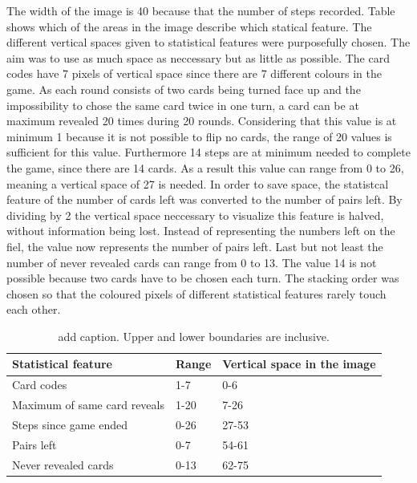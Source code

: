 The width of the image is 40 because that the number of steps recorded. Table  shows which of the areas in the image describe which statical feature. The different vertical spaces given to statistical features were purposefully chosen. The aim was to use as much space as neccessary but as little as possible. The card codes have 7 pixels of vertical space since there are 7 different colours in the game. As each round consists of two cards being turned face up and the impossibility to chose the same card twice in one turn, a card can be at maximum revealed 20 times during 20 rounds. Considering that this value is at minimum 1 because it is not possible to flip no cards, the range of 20 values is sufficient for this value. Furthermore 14 steps are at minimum needed to complete the game, since there are 14 cards. As a result this value can range from 0 to 26, meaning a vertical space of 27 is needed. In order to save space, the statistcal feature of the number of cards left was converted to the number of pairs left. By dividing by 2 the vertical space neccessary to visualize this feature is halved, without information being lost. Instead of representing the numbers left on the fiel, the value now represents the number of pairs left. Last but not least the number of never revealed cards can range from 0 to 13. The value 14 is not possible because two cards have to be chosen each turn. The stacking order was chosen so that the coloured pixels of different statistical features rarely touch each other. 
\begin{table}[H]
	\centering
	\caption{add caption. Upper and lower boundaries are inclusive.}%
	\begin{tabular}{|l|l|l|}
		\hline
		Statistical feature & Range & Vertical space in the image \\
		\hline
		Card codes & 1-7 & 0-6 \\
		Maximum of same card reveals & 1-20 & 7-26 \\
		Steps since game ended & 0-26 & 27-53 \\
		Pairs left & 0-7 & 54-61\\
		Never revealed cards & 0-13 & 62-75 \\
		\hline
	\end{tabular}
\end{table}

